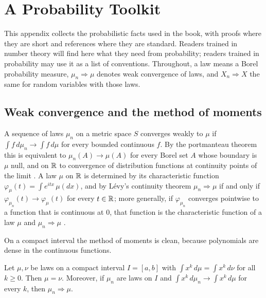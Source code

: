 \chapter{A Probability Toolkit}\label{app:A}

This appendix collects the probabilistic facts used in the book, with proofs where they are short and references where they are standard. Readers trained in number theory will find here what they need from probability; readers trained in probability may use it as a list of conventions. Throughout, a law means a Borel probability measure, $\mu_n\Rightarrow\mu$ denotes weak convergence of laws, and $X_n\Rightarrow X$ the same for random variables with those laws.

\section{Weak convergence and the method of moments}

A sequence of laws $\mu_n$ on a metric space $S$ converges weakly to $\mu$ if $\int f\,d\mu_n\to\int f\,d\mu$ for every bounded continuous $f$. By the portmanteau theorem this is equivalent to $\mu_n(A)\to\mu(A)$ for every Borel set $A$ whose boundary is $\mu$ null, and on $\mathbb{R}$ to convergence of distribution functions at continuity points of the limit \cite{billingsley1968}. A law $\mu$ on $\mathbb{R}$ is determined by its characteristic function $\varphi_\mu(t)=\int e^{itx}\,\mu(dx)$, and by L\'evy's continuity theorem $\mu_n\Rightarrow\mu$ if and only if $\varphi_{\mu_n}(t)\to\varphi_\mu(t)$ for every $t\in\mathbb{R}$; more generally, if $\varphi_{\mu_n}$ converges pointwise to a function that is continuous at $0$, that function is the characteristic function of a law $\mu$ and $\mu_n\Rightarrow\mu$ \cite{billingsley1995}.

On a compact interval the method of moments is clean, because polynomials are dense in the continuous functions.

\begin{theorem}\label{thm:A:moments}
Let $\mu,\nu$ be laws on a compact interval $I=[a,b]$ with $\int x^k\,d\mu=\int x^k\,d\nu$ for all $k\ge0$. Then $\mu=\nu$. Moreover, if $\mu_n$ are laws on $I$ and $\int x^k\,d\mu_n\to\int x^k\,d\mu$ for every $k$, then $\mu_n\Rightarrow\mu$.
\end{theorem}

